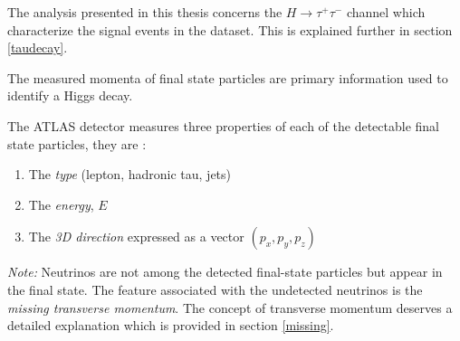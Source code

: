 \begin{center}

\end{center}
 
The analysis presented in this thesis concerns the $H \rightarrow \tau^{+} \tau^{-}$ channel which characterize the signal events in the dataset. This is explained further in section \ref{taudecay}.

The measured momenta of final state particles are primary information used to identify a Higgs decay.

The ATLAS detector measures three properties of each of the detectable final state particles, they are :

\begin{enumerate}[noitemsep]
\item{The \textit{type} (lepton, hadronic tau, jets)} \item{The \textit{energy}, $E$}
\item{The \textit{3D direction} expressed as a vector $(p_{x}, p_{y}, p_{z})$}
\end{enumerate}

\textit{Note:} Neutrinos are not among the detected final-state particles but appear in the final state. The feature associated with the undetected neutrinos is the \textit{missing transverse momentum}. The concept of transverse momentum deserves a detailed explanation which is provided in section \ref{missing}.

